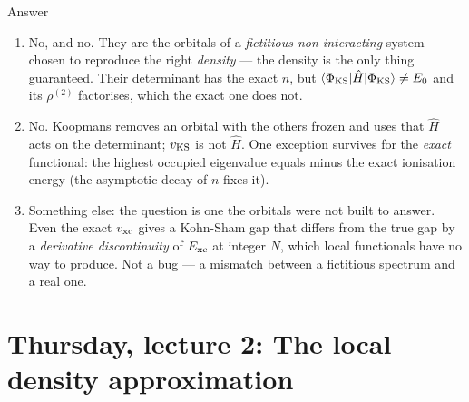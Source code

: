 \documentclass[aspectratio=169,10pt]{beamer}
\newcounter{thinkctr}
\newcommand{\thinka}[1]{%
  \vfill
  \begin{tcolorbox}[enhanced,colback=paleteal,colframe=teal,boxrule=1.2pt,arc=4pt,
    grow to left by=6mm,grow to right by=6mm,
    left=16pt,right=16pt,top=16pt,bottom=18pt,
    fonttitle=\bfseries\Large,fontupper=\large,
    title={Answer to pause \#\thethinkctr}]
  #1
  \end{tcolorbox}
  \vfill}
\newcommand{\element}[3]{\langle #1\vert #2\vert #3\rangle}
\begin{document}
\begin{frame}[shrink=2]{Answer}
  \thinka{
  \begin{enumerate}
    \item No, and no. They are the orbitals of a \emph{fictitious non-interacting} system chosen to reproduce the right \emph{density} --- the density is the only thing guaranteed. Their determinant has the exact $n$, but $\element{\Phi_{\rm KS}}{\hat H}{\Phi_{\rm KS}}\ne E_0$ and its $\rho^{(2)}$ factorises, which the exact one does not.
    \item No. Koopmans removes an orbital with the others frozen and uses that $\hat H$ acts on the determinant; $v_{\rm KS}$ is not $\hat H$. One exception survives for the \emph{exact} functional: the highest occupied eigenvalue equals minus the exact ionisation energy (the asymptotic decay of $n$ fixes it).
    \item Something else: the question is one the orbitals were not built to answer. Even the exact $v_{\rm xc}$ gives a Kohn-Sham gap that differs from the true gap by a \emph{derivative discontinuity} of $E_{\rm xc}$ at integer $N$, which local functionals have no way to produce. Not a bug --- a mismatch between a fictitious spectrum and a real one.
  \end{enumerate}}
\end{frame}

\section{Thursday, lecture 2: The local density approximation}
\end{document}
